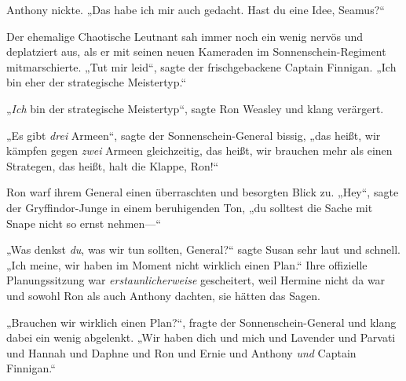 Anthony nickte. „Das habe ich mir auch gedacht. Hast du eine Idee, Seamus?“

Der ehemalige Chaotische Leutnant sah immer noch ein wenig nervös und deplatziert aus, als er mit seinen neuen Kameraden im Sonnenschein-Regiment mitmarschierte. „Tut mir leid“, sagte der frischgebackene Captain Finnigan. „Ich bin eher der strategische Meistertyp.“

„\emph{Ich} bin der strategische Meistertyp“, sagte Ron Weasley und klang verärgert.

„Es gibt \emph{drei} Armeen“, sagte der Sonnenschein-General bissig, „das heißt, wir kämpfen gegen \emph{zwei} Armeen gleichzeitig, das heißt, wir brauchen mehr als einen Strategen, das heißt, halt die Klappe, Ron!“

Ron warf ihrem General einen überraschten und besorgten Blick zu. „Hey“, sagte der Gryffindor-Junge in einem beruhigenden Ton, „du solltest die Sache mit Snape nicht so ernst nehmen—“

„Was denkst \emph{du}, was wir tun sollten, General?“ sagte Susan sehr laut und schnell. „Ich meine, wir haben im Moment nicht wirklich einen Plan.“ Ihre offizielle Planungssitzung war \emph{erstaunlicherweise} gescheitert, weil Hermine nicht da war und sowohl Ron als auch Anthony dachten, sie hätten das Sagen.

„Brauchen wir wirklich einen Plan?“, fragte der Sonnenschein-General und klang dabei ein wenig abgelenkt. „Wir haben dich und mich und Lavender und Parvati und Hannah und Daphne und Ron und Ernie und Anthony \emph{und} Captain Finnigan.“

